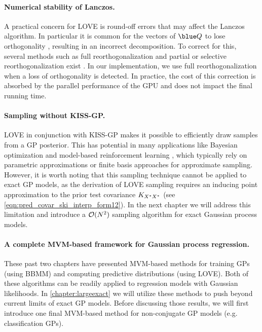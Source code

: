 \paragraph{Numerical stability of Lanczos.}
A practical concern for LOVE{} is round-off errors that may affect the Lanczos algorithm.
In particular it is common for the vectors of $\blue \bQ$ to lose orthogonality \cite{paige1970practical,simon1984lanczos,golub2012matrix}, resulting in an incorrect decomposition.
To correct for this, several methods such as full reorthogonalization and partial or selective reorthogonalization exist \citep[e.g.][]{golub2012matrix}.
In our implementation, we use full reorthogonalization when a loss of orthogonality is detected.
In practice, the cost of this correction is absorbed by the parallel performance of the GPU and does not impact the final running time.


\paragraph{Sampling without KISS-GP.}
LOVE in conjunction with KISS-GP makes it possible to efficiently draw samples from a GP posterior.
This has potential in many applications like Bayesian optimization and model-based reinforcement learning \citep[e.g.,][]{deisenroth2011pilco,hernandez2014predictive,wang2017max}, which typically rely on parametric approximations or finite basis approaches for approximate sampling.
However, it is worth noting that this sampling technique cannot be applied to exact GP models,
as the derivation of LOVE sampling requires an inducing point approximation to the prior test covariance $K_{X^*X^*}$ (see \cref{eqn:pred_covar_ski_interp_form12}).
In the next chapter we will address this limitation and introduce a $\bigo{N^2}$ sampling algorithm for exact Gaussian process models.

\paragraph{A complete MVM-based framework for Gaussian process regression.}
These past two chapters have presented MVM-based methods for training GPs (using BBMM) and computing predictive distributions (using LOVE).
Both of these algorithms can be readily applied to regression models with Gaussian likelihoods.
In \cref{chapter:largeexact} we will utilize these methods to push beyond current limits of exact GP models.
Before discussing those results, we will first introduce one final MVM-based method for non-conjugate GP models (e.g. classification GPs).
